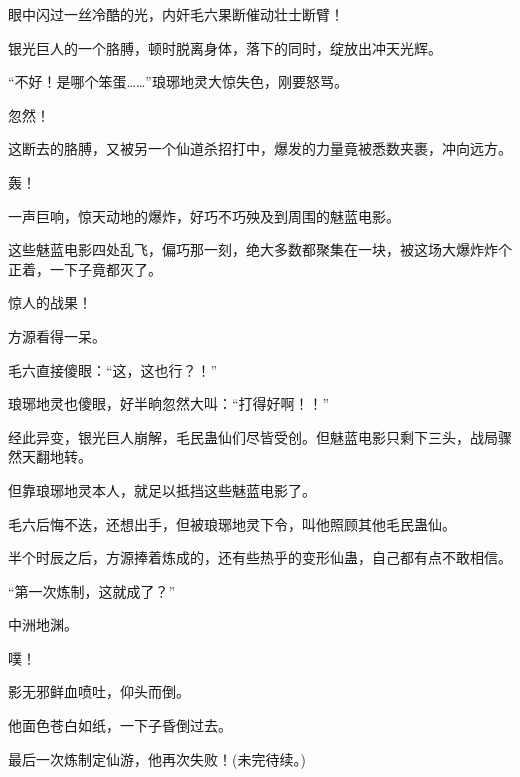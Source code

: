 \begin{this_body}
眼中闪过一丝冷酷的光，内奸毛六果断催动壮士断臂！

银光巨人的一个胳膊，顿时脱离身体，落下的同时，绽放出冲天光辉。

“不好！是哪个笨蛋……”琅琊地灵大惊失色，刚要怒骂。

忽然！

这断去的胳膊，又被另一个仙道杀招打中，爆发的力量竟被悉数夹裹，冲向远方。

轰！

一声巨响，惊天动地的爆炸，好巧不巧殃及到周围的魅蓝电影。

这些魅蓝电影四处乱飞，偏巧那一刻，绝大多数都聚集在一块，被这场大爆炸炸个正着，一下子竟都灭了。

惊人的战果！

方源看得一呆。

毛六直接傻眼：“这，这也行？！”

琅琊地灵也傻眼，好半晌忽然大叫：“打得好啊！！”

经此异变，银光巨人崩解，毛民蛊仙们尽皆受创。但魅蓝电影只剩下三头，战局骤然天翻地转。

但靠琅琊地灵本人，就足以抵挡这些魅蓝电影了。

毛六后悔不迭，还想出手，但被琅琊地灵下令，叫他照顾其他毛民蛊仙。

半个时辰之后，方源捧着炼成的，还有些热乎的变形仙蛊，自己都有点不敢相信。

“第一次炼制，这就成了？”

中洲地渊。

噗！

影无邪鲜血喷吐，仰头而倒。

他面色苍白如纸，一下子昏倒过去。

最后一次炼制定仙游，他再次失败！(未完待续。)

\end{this_body}

